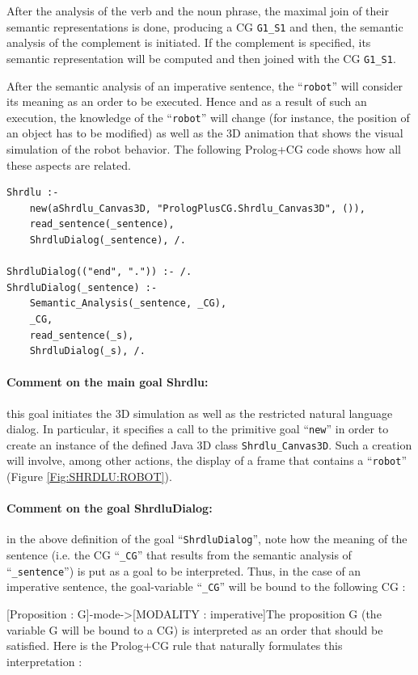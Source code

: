 \documentclass{book}
\begin{document}
After the analysis of the verb and the noun phrase, the maximal join
of their semantic representations is done, producing a CG
\texttt{G1\_S1} and then, the semantic analysis of the complement is
initiated. If the complement is specified, its semantic representation
will be computed and then joined with the CG \texttt{G1\_S1}.

After the semantic analysis of an imperative sentence, the
``\texttt{robot}'' will consider its meaning as an order to be
executed. Hence and as a result of such an execution, the knowledge of
the ``\texttt{robot}'' will change (for instance, the position of an
object has to be modified) as well as the 3D animation that shows the
visual simulation of the robot behavior. The following Prolog+CG code
shows how all these aspects are related.


\begin{verbatim}
Shrdlu :-
    new(aShrdlu_Canvas3D, "PrologPlusCG.Shrdlu_Canvas3D", ()),
    read_sentence(_sentence),
    ShrdluDialog(_sentence), /.

ShrdluDialog(("end", ".")) :- /.
ShrdluDialog(_sentence) :-
    Semantic_Analysis(_sentence, _CG),   
    _CG,
    read_sentence(_s),
    ShrdluDialog(_s), /.
\end{verbatim}


\paragraph{Comment on the main goal Shrdlu:} this goal initiates the 3D
simulation as well as the restricted natural language dialog. In
particular, it specifies a call to the primitive goal ``\texttt{new}''
in order to create an instance of the defined Java 3D class
\texttt{Shrdlu\_Canvas3D}. Such a creation will involve, among other
actions, the display of a frame that contains a ``\texttt{robot}''
(Figure \ref{Fig:SHRDLU:ROBOT}).

\paragraph{Comment on the goal ShrdluDialog:} in the above definition of the goal ``\texttt{ShrdluDialog}'', note how the meaning of the sentence
(i.e. the CG ``\texttt{\_CG}'' that results from the semantic analysis
of ``\texttt{\_sentence}'') is put as a goal to be interpreted. Thus,
in the case of an imperative sentence, the goal-variable
``\texttt{\_CG}'' will be bound to the following CG :

[Proposition : G]-mode->[MODALITY : imperative]The proposition G (the
variable G will be bound to a CG) is interpreted as an order that
should be satisfied. Here is the Prolog+CG rule that naturally
formulates this interpretation :
\end{document}
